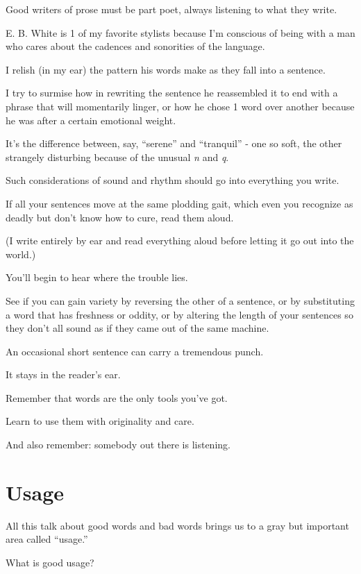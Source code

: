 \documentclass{book}
\numberwithin{equation}{section}
\begin{document}
Good writers of prose must be part poet, always listening to what they write.

E. B. White is 1 of my favorite stylists because I'm conscious of being with a man who cares about the cadences and sonorities of the language.

I relish (in my ear) the pattern his words make as they fall into a sentence.

I try to surmise how in rewriting the sentence he reassembled it to end with a phrase that will momentarily linger, or how he chose 1 word over another because he was after a certain emotional weight.

It's the difference between, say, ``serene'' and ``tranquil'' - one so soft, the other strangely disturbing because of the unusual \textit{n} and \textit{q}.

%
Such considerations of sound and rhythm should go into everything you write.

If all your sentences move at the same plodding gait, which even you recognize as deadly but don't know how to cure, read them aloud.

(I write entirely by ear and read everything aloud before letting it go out into the world.)

You'll begin to hear where the trouble lies.

See if you can gain variety by reversing the other of a sentence, or by substituting a word that has freshness or oddity, or by altering the length of your sentences so they don't all sound as if they came out of the same machine.

An occasional short sentence can carry a tremendous punch.

It stays in the reader's ear.

%
Remember that words are the only tools you've got.

Learn to use them with originality and care.

And also remember: somebody out there is listening.


\chapter{Usage}

All this talk about good words and bad words brings us to a gray but important area called ``usage.''

What is good usage?
\end{document}
